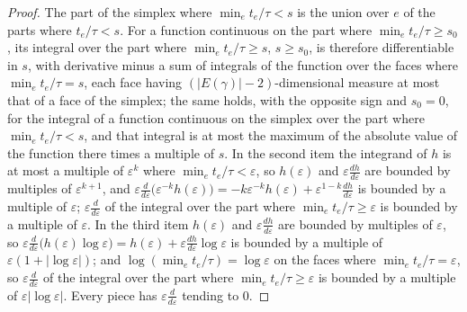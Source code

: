 \begin{proof}
The part of the simplex where $\min_et_e/\tau<s$ is the union over $e$ of the parts where $t_e/\tau<s$. For a function continuous on the part where $\min_et_e/\tau\ge s_0$, its integral over the part where $\min_et_e/\tau\ge s$, $s\ge s_0$, is therefore differentiable in $s$, with derivative minus a sum of integrals of the function over the faces where $\min_et_e/\tau=s$, each face having $(|E(\gamma)|-2)$-dimensional measure at most that of a face of the simplex; the same holds, with the opposite sign and $s_0=0$, for the integral of a function continuous on the simplex over the part where $\min_et_e/\tau<s$, and that integral is at most the maximum of the absolute value of the function there times a multiple of $s$. In the second item the integrand of $h$ is at most a multiple of $\varepsilon^k$ where $\min_et_e/\tau<\varepsilon$, so $h(\varepsilon)$ and $\varepsilon\frac{dh}{d\varepsilon}$ are bounded by multiples of $\varepsilon^{k+1}$, and $\varepsilon\frac{d}{d\varepsilon}\big(\varepsilon^{-k}h(\varepsilon)\big)=-k\varepsilon^{-k}h(\varepsilon)+\varepsilon^{1-k}\frac{dh}{d\varepsilon}$ is bounded by a multiple of $\varepsilon$; $\varepsilon\frac{d}{d\varepsilon}$ of the integral over the part where $\min_et_e/\tau\ge\varepsilon$ is bounded by a multiple of $\varepsilon$. In the third item $h(\varepsilon)$ and $\varepsilon\frac{dh}{d\varepsilon}$ are bounded by multiples of $\varepsilon$, so $\varepsilon\frac{d}{d\varepsilon}\big(h(\varepsilon)\log\varepsilon\big)=h(\varepsilon)+\varepsilon\frac{dh}{d\varepsilon}\log\varepsilon$ is bounded by a multiple of $\varepsilon(1+|\log\varepsilon|)$; and $\log(\min_et_e/\tau)=\log\varepsilon$ on the faces where $\min_et_e/\tau=\varepsilon$, so $\varepsilon\frac{d}{d\varepsilon}$ of the integral over the part where $\min_et_e/\tau\ge\varepsilon$ is bounded by a multiple of $\varepsilon|\log\varepsilon|$. Every piece has $\varepsilon\frac{d}{d\varepsilon}$ tending to $0$.
\end{proof}

